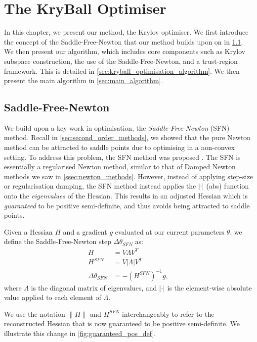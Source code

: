 \chapter{The KryBall Optimiser}
\label{chap:method}

In this chapter, we present our method, the Krylov optimiser. We first introduce the concept of the Saddle-Free-Newton that our method builds upon on in \cref{sec:saddle_free_newton}. We then present our algorithm, which includes core components such as Krylov subspace construction, the use of the Saddle-Free-Newton, and a trust-region framework. This is detailed in \cref{sec:kryball_optimisation_algorithm}. We then present the main algorithm in \cref{sec:main_algorithm}.

\section{Saddle-Free-Newton}
\label{sec:saddle_free_newton}

We build upon a key work in optimisation, the \textit{Saddle-Free-Newton} (SFN) method. Recall in \cref{sec:second_order_methods}, we showed that the pure Newton method can be attracted to saddle points due to optimising in a non-convex setting. To address this problem, the SFN method was proposed \citep{dauphin2014sfn}. The SFN is essentially a regularised Newton method, similar to that of Damped Newton methods we saw in \cref{ssec:newton_methods}. However, instead of applying step-size or regularisation damping, the SFN method instead applies the $|\cdot|$ (abs) function onto the \textit{eigenvalues} of the Hessian. This results in an adjusted Hessian which is \textit{guaranteed} to be positive semi-definite, and thus avoids being attracted to saddle points. 

\begin{definition}
    Given a Hessian $H$ and a gradient $g$ evaluated at our current parameters $\theta$, we define the Saddle-Free-Newton step $\Delta \theta_{SFN}$ as:
    \begin{align}
        H &= V \Lambda V^T \\
        H^{SFN} &= V |\Lambda| V^T \\
        \Delta \theta_{SFN} &= -(H^{SFN})^{-1} g,
    \end{align}
    where $\Lambda$ is the diagonal matrix of eigenvalues, and $|\cdot|$ is the element-wise absolute value applied to each element of $\Lambda$.
\end{definition}
We use the notation $\| H \|$ and $H^{SFN}$ interchangeably to refer to the reconstructed Hessian that is now guaranteed to be positive semi-definite. We illustrate this change in \cref{fig:guaranteed_pos_def}.

